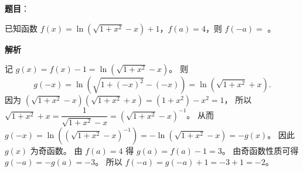 \begin{answer}

\textbf{题目}：

已知函数 $f(x) = \ln(\sqrt{1 + x^2} - x) + 1$，$f(a) = 4$，则 $f(-a) =$ \underline{\hspace{2cm}}。

\textbf{解析}

记 $g(x) = f(x) - 1 = \ln(\sqrt{1 + x^2} - x)$。
则
\nopagebreak[4]
\[g(-x) = \ln(\sqrt{1 + (-x)^2} - (-x)) = \ln(\sqrt{1 + x^2} + x).\]
因为 $(\sqrt{1 + x^2} - x)(\sqrt{1 + x^2} + x) = (1 + x^2) - x^2 = 1$，
所以 $\sqrt{1 + x^2} + x = \dfrac{1}{\sqrt{1 + x^2} - x} = (\sqrt{1 + x^2} - x)^{-1}$。
从而 $g(-x) = \ln((\sqrt{1 + x^2} - x)^{-1}) = -\ln(\sqrt{1 + x^2} - x) = -g(x)$。
因此 $g(x)$ 为奇函数。
由 $f(a) = 4$ 得 $g(a) = f(a) - 1 = 3$。
由奇函数性质可得 $g(-a) = -g(a) = -3$。
所以 $f(-a) = g(-a) + 1 = -3 + 1 = -2$。


\par\medskip

\end{answer}

